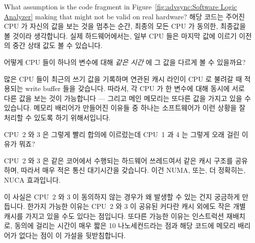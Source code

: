 \begin{enumerate}
	What assumption is the code fragment
	in Figure~\ref{fig:advsync:Software Logic Analyzer}
	making that might not be valid on real hardware?
	\fi
\QuickA{}
	해당 코드는 주어진 CPU 가 자신의 값을 보는 것을 멈추는 순간, 최종의
	모든 CPU 가 동의한, 최종값을 볼 것이라 생각합니다.
	실제 하드웨어에서는, 일부 CPU 들은 마지막 값에 이르기 이전의 중간 상태
	값도 볼 수 있습니다.

\QuickQ{}
	어떻게 CPU 들이 하나의 변수에 대해 \emph{같은 시간} 에 그 값을 다르게
	볼 수 있을까요?

\QuickA{}
	많은 CPU 들이 최근의 쓰기 값을 기록하며 연관된 캐시 라인이 CPU 로
	불려갈 때 적용되는 write buffer 들을 갖습니다.
	따라서, 각 CPU 가 한 변수에 대해 동시에 서로 다른 값을 보는 것이
	가능합니다 --- 그리고 메인 메모리는 또다른 값을 가지고 있을 수
	있습니다.
	메모리 배리어가 만들어진 이유들 중 하나는 소프트웨어가 이런 상황을 잘
	처리할 수 있도록 하기 위해서입니다.

\QuickQ{}
	CPU~2 와 3 은 그렇게 빨리 합의에 이르렀는데 CPU~1 과 4 는 그렇게 오래
	걸린 이유가 뭐죠?

\QuickA{}
	CPU~2 와 3 은 같은 코어에서 수행되는 하드웨어 쓰레드여서 같은 캐시
	구조를 공유하며, 따라서 매우 적은 통신 대기시간을 갖습니다.
	이건 NUMA, 또는, 더 정확히는, NUCA 효과입니다.

	이 사실은 CPU~2 와 3 이 동의하지 않는 경우가 왜 발생할 수 있는 건지
	궁금하게 만듭니다.
	한가지 가능한 이유는 CPU~2 와 3 이 공유된 커다란 캐시 외에도 작은 개별
	캐시를 가지고 있을 수도 있다는 점입니다.
	또다른 가능한 이유는 인스트럭션 재배치로, 동의에 걸리는 시간이 매우
	짧은 10 나노세컨드라는 점과 해당 코드에 메모리 배리어가 없다는 점이 이
	가설을 뒷받침합니다.
	\iffalse


\end{enumerate}
